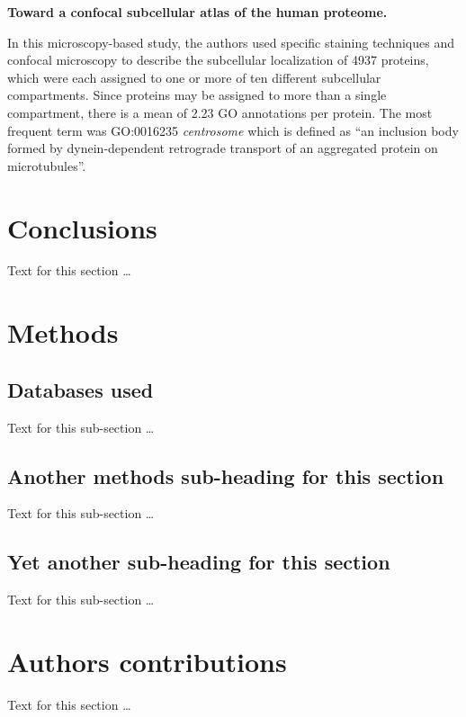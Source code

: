 \documentclass[10pt]{bmc_article}
\newenvironment{bmcformat}{\begin{raggedright}\baselineskip20pt\sloppy\setboolean{publ}{false}}{\end{raggedright}\baselineskip20pt\sloppy}
\begin{document}
\begin{bmcformat}
\textbf{Toward a confocal subcellular atlas of the human proteome.}

In this microscopy-based study, the authors used specific staining techniques and
confocal microscopy to describe the subcellular localization of 4937 proteins, which
were each assigned to one or more of ten different subcellular compartments. Since
proteins may be assigned to more than a single compartment, there is a mean of 2.23
GO annotations per protein. The most frequent term was GO:0016235
\textit{centrosome} which is defined as ``an inclusion body formed by
dynein-dependent retrograde transport of an aggregated protein on
microtubules''\cite{PMID:11121744}. 





\section*{Conclusions}
  Text for this section \ldots


  
\section*{Methods}
  \subsection*{Databases used}
    Text for this sub-section \ldots

  \subsection*{Another methods sub-heading for this section}
    Text for this sub-section \ldots

  \subsection*{Yet another sub-heading for this section}
    Text for this sub-section \ldots


    
\section*{Authors contributions}
    Text for this section \ldots

    


\end{bmcformat}
\end{document}
